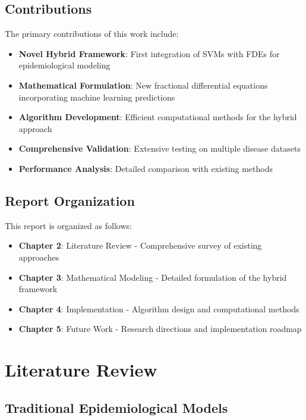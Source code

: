 \documentclass[12pt,a4paper]{report}
\begin{document}
\section{Contributions}

The primary contributions of this work include:

\begin{itemize}
    \item \textbf{Novel Hybrid Framework}: First integration of SVMs with FDEs for epidemiological modeling
    \item \textbf{Mathematical Formulation}: New fractional differential equations incorporating machine learning predictions
    \item \textbf{Algorithm Development}: Efficient computational methods for the hybrid approach
    \item \textbf{Comprehensive Validation}: Extensive testing on multiple disease datasets
    \item \textbf{Performance Analysis}: Detailed comparison with existing methods
\end{itemize}

\section{Report Organization}

This report is organized as follows:

\begin{itemize}
    \item \textbf{Chapter 2}: Literature Review - Comprehensive survey of existing approaches
    \item \textbf{Chapter 3}: Mathematical Modeling - Detailed formulation of the hybrid framework
    \item \textbf{Chapter 4}: Implementation - Algorithm design and computational methods
    \item \textbf{Chapter 5}: Future Work - Research directions and implementation roadmap
\end{itemize}

\newpage

\chapter{Literature Review}

\section{Traditional Epidemiological Models}
\end{document}
